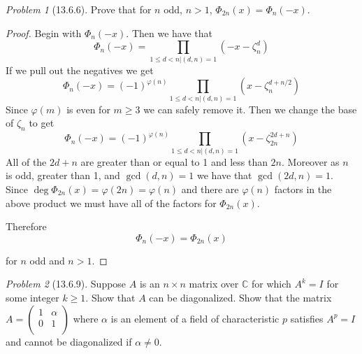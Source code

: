 \documentclass[10pt]{article}
\newcommand{\sk}{\vskip 10mm}
\newcommand{\bb}[1]{\mathbb{#1}}
\theoremstyle{remark}
\newtheorem{problem}{Problem}
\theoremstyle{remark}
\begin{document}
\begin{problem}[13.6.6]
  Prove that for $n$ odd, $n>1$, $\Phi_{2n}(x)=\Phi_n(-x)$.
\end{problem}

\begin{proof}
  Begin with $\Phi_n(-x)$. Then we have that
  \[
    \Phi_n(-x) = \prod_{1\leq d<n|(d,n)=1}(-x-\zeta_n^d)
  \]
  If we pull out the negatives we get
  \[
    \Phi_n(-x) = (-1)^{\varphi(n)}\prod_{1\leq d<n|(d,n)=1}(x-\zeta_n^{d+n/2})
  \]
  Since $\varphi(m)$ is even for $m\geq 3$ we can safely remove it. Then
  we change the base of $\zeta_n$ to get
  \[
    \Phi_n(-x) = (-1)^{\varphi(n)}\prod_{1\leq d<n|(d,n)=1}(x-\zeta_{2n}^{2d+n})
  \]
  All of the $2d+n$ are greater than or equal to 1 and less than
  $2n$. Moreover as $n$ is odd, greater than 1, and $\gcd(d,n)=1$
  we have that $\gcd(2d,n)=1$. Since $\deg \Phi_{2n}(x)=\varphi(2n)=\varphi(n)$ and
  there are $\varphi(n)$ factors in the above product we must have all of
  the factors for $\Phi_{2n}(x)$.
  
  Therefore
  \[
    \Phi_n(-x)=\Phi_{2n}(x)
  \]

  for $n$ odd and $n>1$.
\end{proof}

\sk

\begin{problem}[13.6.9]
  Suppose $A$ is an $n\times n$ matrix over $\bb{C}$ for which $A^k=I$
  for some integer $k\geq1$. Show that $A$ can be diagonalized.
  Show that the matrix
  $A=\left(\begin{array}{cc}1&\alpha\\0&1\\ \end{array}\right)$
  where $\alpha$ is an element of a field of characteristic $p$ satisfies
  $A^p=I$ and cannot be diagonalized if $\alpha\neq 0$.
\end{problem}
\end{document}

